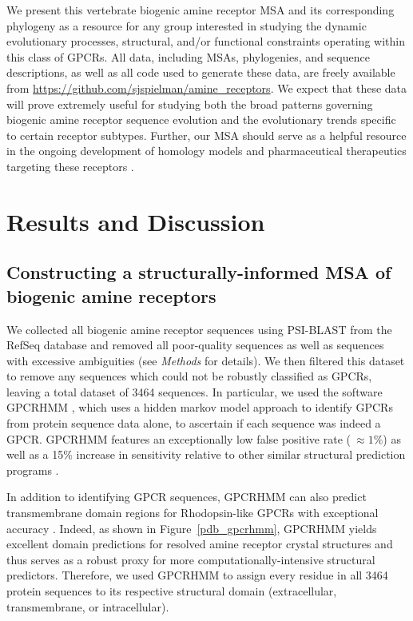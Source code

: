 \documentclass[fleqn,10pt]{wlpeerj}
\begin{document}
We present this vertebrate biogenic amine receptor MSA and its corresponding phylogeny as a resource for any group interested in studying the dynamic evolutionary processes, structural, and/or functional constraints operating within this class of GPCRs. All data, including MSAs, phylogenies, and sequence descriptions, as well as all code used to generate these data, are freely available from \url{https://github.com/sjspielman/amine\_receptors}. We expect that these data will prove extremely useful for studying both the broad patterns governing biogenic amine receptor sequence evolution and the evolutionary trends specific to certain receptor subtypes. Further, our MSA should serve as a helpful resource in the ongoing development of homology models and pharmaceutical therapeutics targeting these receptors \citep{Kristiansen2004,Ishiguro2004,Eversetal2005,Masonetal2012}.




\section*{Results and Discussion}

\subsection*{Constructing a structurally-informed MSA of biogenic amine receptors}

We collected all biogenic amine receptor sequences using PSI-BLAST from the RefSeq database \citep{refseq} and removed all poor-quality sequences as well as  sequences with excessive ambiguities (see \emph{Methods} for details). We then filtered this dataset to remove any sequences which could not be robustly classified as GPCRs, leaving a total dataset of 3464 sequences. In particular, we used the software GPCRHMM \citep{Wistrand2006}, which uses a hidden markov model approach to identify GPCRs from protein sequence data alone, to ascertain if each sequence was indeed a GPCR. GPCRHMM features an exceptionally low false positive rate ($~\approx 1\%$) as well as a 15\% increase in sensitivity relative to other similar structural prediction programs \citep{Wistrand2006}. 

In addition to identifying GPCR sequences, GPCRHMM can also predict transmembrane domain regions for Rhodopsin-like GPCRs with exceptional accuracy \citep{SpielmanWilke2013}. Indeed, as shown in Figure~\ref{pdb_gpcrhmm}, GPCRHMM yields excellent domain predictions for resolved amine receptor crystal structures and thus serves as a robust proxy for more computationally-intensive structural predictors. Therefore, we used GPCRHMM to assign every residue in all 3464 protein sequences to its respective structural domain (extracellular, transmembrane, or intracellular). 
\end{document}
